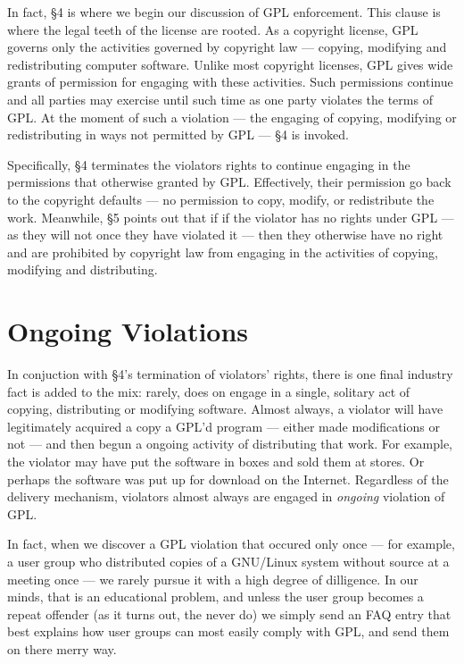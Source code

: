 \documentclass[12pt]{report}
\begin{document}
In fact, \S 4 is where we begin our discussion of GPL enforcement.  This
clause is where the legal teeth of the license are rooted.  As a copyright
license, GPL governs only the activities governed by copyright law ---
copying, modifying and redistributing computer software.  Unlike most
copyright licenses, GPL gives wide grants of permission for engaging with
these activities.  Such permissions continue and all parties may exercise
until such time as one party violates the terms of GPL\@.  At the moment
of such a violation --- the engaging of copying, modifying or
redistributing in ways not permitted by GPL --- \S 4 is invoked.

Specifically, \S 4 terminates the violators rights to continue engaging
in the permissions that otherwise granted by GPL\@.  Effectively, their
permission go back to the copyright defaults --- no permission to copy,
modify, or redistribute the work.  Meanwhile, \S 5 points out that if
if the violator has no rights under GPL --- as they will not once they
have violated it --- then they otherwise have no right and are prohibited
by copyright law from engaging in the activities of copying, modifying
and distributing.

\section{Ongoing Violations}

In conjuction with \S 4's termination of violators' rights, there is one
final industry fact is added to the mix: rarely, does on engage in a
single, solitary act of copying, distributing or modifying software.
Almost always, a violator will have legitimately acquired a copy a GPL'd
program --- either made modifications or not --- and then begun a ongoing
activity of distributing that work.  For example, the violator may have
put the software in boxes and sold them at stores.  Or perhaps the
software was put up for download on the Internet.  Regardless of the
delivery mechanism, violators almost always are engaged in {\em ongoing\/}
violation of GPL\@.

In fact, when we discover a GPL violation that occured only once --- for
example, a user group who distributed copies of a GNU/Linux system without
source at a meeting once --- we rarely pursue it with a high degree of
dilligence.  In our minds, that is an educational problem, and unless the
user group becomes a repeat offender (as it turns out, the never do) we
simply send an FAQ entry that best explains how user groups can most
easily comply with GPL, and send them on there merry way.
\end{document}
